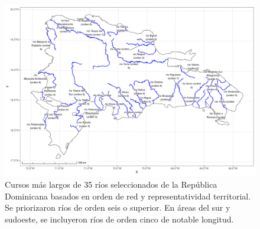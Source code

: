 \documentclass[spanish]{article}
\begin{document}
\begin{figure}[H]

{\centering \includegraphics[width=1\linewidth]{figuras/cursos-mas-largos} 

}

\caption{Cursos más largos de 35 ríos seleccionados de la República Dominicana basados en orden de red y representatividad territorial. Se priorizaron ríos de orden seis o superior. En áreas del sur y sudoeste, se incluyeron ríos de orden cinco de notable longitud.}\label{fig:cursosmaslargos}
\end{figure}
\end{document}
